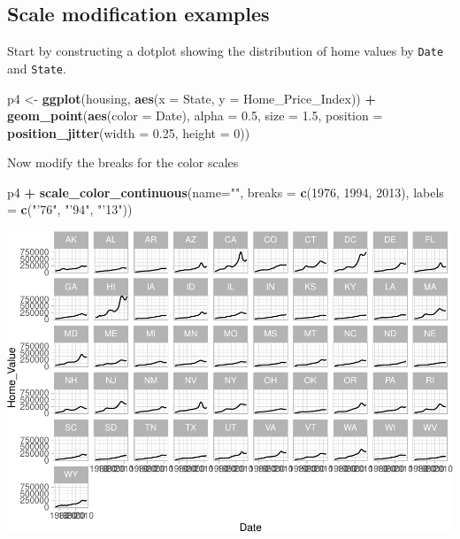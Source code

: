 \documentclass[]{book}
\newenvironment{Shaded}{\begin{snugshade}}{\end{snugshade}}
\newcommand{\DataTypeTok}[1]{\textcolor[rgb]{0.13,0.29,0.53}{#1}}
\newcommand{\DecValTok}[1]{\textcolor[rgb]{0.00,0.00,0.81}{#1}}
\newcommand{\FloatTok}[1]{\textcolor[rgb]{0.00,0.00,0.81}{#1}}
\newcommand{\KeywordTok}[1]{\textcolor[rgb]{0.13,0.29,0.53}{\textbf{#1}}}
\newcommand{\NormalTok}[1]{#1}
\newcommand{\OperatorTok}[1]{\textcolor[rgb]{0.81,0.36,0.00}{\textbf{#1}}}
\newcommand{\StringTok}[1]{\textcolor[rgb]{0.31,0.60,0.02}{#1}}
\begin{document}
\hypertarget{scale-modification-examples}{%
\subsection{Scale modification examples}\label{scale-modification-examples}}

Start by constructing a dotplot showing the distribution of home values by \texttt{Date} and \texttt{State}.

\begin{Shaded}
\begin{Highlighting}[]
\NormalTok{p4 <-}\StringTok{ }\KeywordTok{ggplot}\NormalTok{(housing, }\KeywordTok{aes}\NormalTok{(}\DataTypeTok{x =}\NormalTok{ State, }\DataTypeTok{y =}\NormalTok{ Home_Price_Index)) }\OperatorTok{+}\StringTok{ }
\StringTok{    }\KeywordTok{geom_point}\NormalTok{(}\KeywordTok{aes}\NormalTok{(}\DataTypeTok{color =}\NormalTok{ Date), }\DataTypeTok{alpha =} \FloatTok{0.5}\NormalTok{, }\DataTypeTok{size =} \FloatTok{1.5}\NormalTok{,}
               \DataTypeTok{position =} \KeywordTok{position_jitter}\NormalTok{(}\DataTypeTok{width =} \FloatTok{0.25}\NormalTok{, }\DataTypeTok{height =} \DecValTok{0}\NormalTok{))}
\end{Highlighting}
\end{Shaded}

Now modify the breaks for the color scales

\begin{Shaded}
\begin{Highlighting}[]
\NormalTok{p4 }\OperatorTok{+}\StringTok{ }
\StringTok{  }\KeywordTok{scale_color_continuous}\NormalTok{(}\DataTypeTok{name=}\StringTok{""}\NormalTok{,}
                         \DataTypeTok{breaks =} \KeywordTok{c}\NormalTok{(}\DecValTok{1976}\NormalTok{, }\DecValTok{1994}\NormalTok{, }\DecValTok{2013}\NormalTok{),}
                         \DataTypeTok{labels =} \KeywordTok{c}\NormalTok{(}\StringTok{"'76"}\NormalTok{, }\StringTok{"'94"}\NormalTok{, }\StringTok{"'13"}\NormalTok{))}
\end{Highlighting}
\end{Shaded}

\includegraphics{R/Rgraphics/figures/unnamed-chunk-183-1.pdf}
\end{document}
